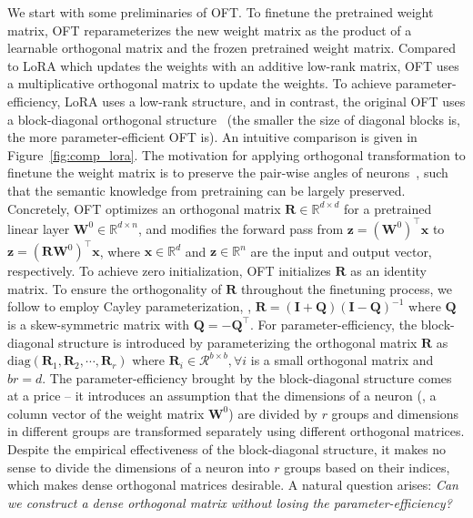 We start with some preliminaries of OFT. To finetune the pretrained weight matrix, OFT reparameterizes the new weight matrix as the product of a learnable orthogonal matrix and the frozen pretrained weight matrix. Compared to LoRA which updates the weights with an additive low-rank matrix, OFT uses a multiplicative orthogonal matrix to update the weights. To achieve parameter-efficiency, LoRA uses a low-rank structure, and in contrast, the original OFT uses a block-diagonal orthogonal structure~\cite{qiu2023controlling} (the smaller the size of diagonal blocks is, the more parameter-efficient OFT is). An intuitive comparison is given in Figure~\ref{fig:comp_lora}. The motivation for applying orthogonal transformation to finetune the weight matrix is to preserve the pair-wise angles of neurons~\cite{liu2018learning,liu2021orthogonal,qiu2023controlling}, such that the semantic knowledge from pretraining can be largely preserved. Concretely, OFT optimizes an orthogonal matrix $\bm{R}\in\mathbb{R}^{d\times d}$ for a pretrained linear layer $\bm{W}^0\in\mathbb{R}^{d\times n}$, and modifies the forward pass from $\bm{z}=(\bm{W}^0)^\top\bm{x}$ to $\bm{z}=(\bm{R}\bm{W}^0)^\top\bm{x}$, where $\bm{x}\in\mathbb{R}^{d}$ and $\bm{z}\in\mathbb{R}^{n}$ are the input and output vector, respectively. To achieve zero initialization, OFT initializes $\bm{R}$ as an identity matrix. To ensure the orthogonality of $\bm{R}$ throughout the finetuning process, we follow \cite{qiu2023controlling,liu2021orthogonal} to employ Cayley parameterization, \ie, $\bm{R}=(\bm{I}+\bm{Q})(\bm{I}-\bm{Q})^{-1}$ where $\bm{Q}$ is a skew-symmetric matrix with $\bm{Q}=-\bm{Q}^\top$. For parameter-efficiency, the block-diagonal structure is introduced by parameterizing the orthogonal matrix $\bm{R}$ as $\text{diag}(\bm{R}_1,\bm{R}_2,\cdots,\bm{R}_r)$ where $\bm{R}_i\in\mathcal{R}^{b\times b},\forall i$ is a small orthogonal matrix and $br=d$. The parameter-efficiency brought by the block-diagonal structure comes at a price -- it introduces an assumption that the dimensions of a neuron (\ie, a column vector of the weight matrix $\bm{W}^0$) are divided by $r$ groups and dimensions in different groups are transformed separately using different orthogonal matrices. Despite the empirical effectiveness of the block-diagonal structure, it makes no sense to divide the dimensions of a neuron into $r$ groups based on their indices, which makes dense orthogonal matrices desirable. A natural question arises: \emph{Can we construct a dense orthogonal matrix without losing the parameter-efficiency?}

